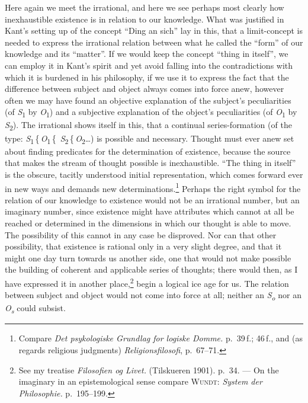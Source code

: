 \documentclass[12pt,a4paper]{book}
\newcommand{\opage}[1]{\marginnote{\footnotesize\textit{[#1]}}}
\begin{document}
Here again we meet the irrational, and here we see perhaps \opage{51}most clearly how
inexhaustible existence is in relation to our knowledge. What was justified in
Kant's setting up of the concept ``Ding an sich'' lay in this, that a
limit-concept is needed to express the irrational relation between what he called
the ``form'' of our knowledge and its ``matter''. If we would keep the concept
``thing in itself'', we can employ it in Kant's spirit and yet avoid falling into
the contradictions with which it is burdened in his philosophy, if we use it to
express the fact that the difference between subject and object always comes into
force anew, however often we may have found an objective explanation of the
subject's peculiarities (of \textit{S}\textsubscript{1} by
\textit{O}\textsubscript{1}) and a subjective explanation of the object's
peculiarities (of \textit{O}\textsubscript{1} by \textit{S}\textsubscript{2}).
The irrational shows itself in this, that a continual series-formation (of the
type: \textit{S}\textsubscript{1}\,\{\,\textit{O}\textsubscript{1}\,\{\,%
\textit{S}\textsubscript{2}\,\{\,\textit{O}\textsubscript{2}\dots) is possible
and necessary. Thought must ever anew set about finding predicates for the
determination of existence, because the source that makes the stream of thought
possible is inexhaustible. ``The thing in itself'' is the obscure, tacitly
understood initial representation, which comes forward ever in new ways and
demands new determinations.\footnote{Compare \textit{Det psykologiske Grundlag
for logiske Domme.} p.~39\,f.; 46\,f., and (as regards religious judgments)
\textit{Religionsfilosofi}, p.~67--71.} Perhaps the right symbol for the relation
of our knowledge to existence would not be an irrational number, but an imaginary
number, since existence might have attributes which cannot at all be reached or
determined in the dimensions in which our thought is able to move. The
possibility of this cannot in any case be disproved. Nor can that other
possibility, that existence is rational only in a very slight degree, and that it
might one day turn towards us another side, one that would not make possible the
building of coherent and applicable series of thoughts; there would then, as I
have expressed it in another place,\footnote{See my treatise \textit{Filosofien
og Livet.} (Tilskueren 1901). p.~34. --- On the imaginary in an epistemological
sense compare \textsc{Wundt}: \textit{System der Philosophie.} p.~195--199.}
begin a logical ice age for us. The relation between subject and object would not
come into force at all; neither an \textit{S}\textsubscript{\textit{o}} nor an
\textit{O}\textsubscript{\textit{s}} could subsist.
\end{document}
